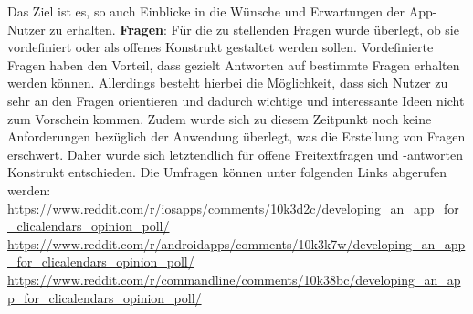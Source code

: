 	Das Ziel ist es, so auch Einblicke in die Wünsche und Erwartungen der App-Nutzer zu erhalten.%
%
\newline
\myNewSection
\textbf{Fragen}: %
Für die zu stellenden Fragen wurde überlegt, ob sie vordefiniert oder als offenes Konstrukt gestaltet werden sollen. %
	Vordefinierte Fragen haben den Vorteil, dass gezielt Antworten auf bestimmte Fragen erhalten werden können. %
	Allerdings besteht hierbei die Möglichkeit, dass sich Nutzer zu sehr an den Fragen orientieren und dadurch wichtige und interessante Ideen nicht zum Vorschein kommen. %
	Zudem wurde sich zu diesem Zeitpunkt noch keine Anforderungen bezüglich der Anwendung überlegt, was die Erstellung von Fragen erschwert. %
Daher wurde sich letztendlich für offene Freitextfragen und -antworten Konstrukt entschieden.%
%
\myNewSection
Die Umfragen können unter folgenden Links abgerufen werden: %
\newline%
\url{https://www.reddit.com/r/iosapps/comments/10k3d2c/developing_an_app_for_clicalendars_opinion_poll/}
\newline%
\url{https://www.reddit.com/r/androidapps/comments/10k3k7w/developing_an_app_for_clicalendars_opinion_poll/}
\newline%
\url{https://www.reddit.com/r/commandline/comments/10k38bc/developing_an_app_for_clicalendars_opinion_poll/}